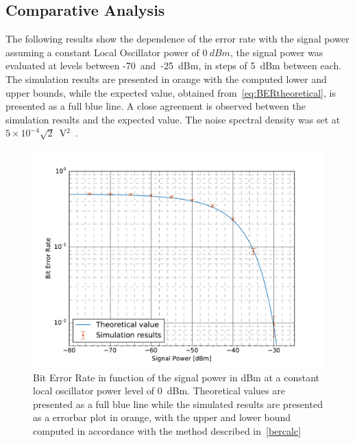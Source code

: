\subsection{Comparative Analysis}

The following results show the dependence of the error rate with the signal power assuming a constant Local Oscillator power of $0~dBm$, the signal power was evaluated at levels between -70~and~-25~dBm, in steps of 5~dBm between each. The simulation results are presented in orange with the computed lower and upper bounds, while the expected value, obtained from~\eqref{eq:BERtheoretical}, is presented as a full blue line. A close agreement is observed between the simulation results and the expected value. The noise spectral density was set at $5\times10^{-4}\sqrt{2}$~V$^2$~\cite{thorlabs}.
\begin{figure}[H]
\centering
\includegraphics[width=.7\linewidth]{./sdf/bpsk_system/figures/BER_Evolution.pdf}
\caption{Bit Error Rate in function of the signal power in dBm at a constant local oscillator power level of 0~dBm. Theoretical values are presented as a full blue line while the simulated results are presented as a errorbar plot in orange, with the upper and lower bound computed in accordance with the method described in~\ref{bercalc}}
\label{fig:berevolution}
\end{figure}

\newpage



\renewcommand{\bibname}{References}
%


%
%


\cleardoublepage